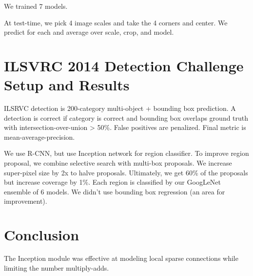 \documentclass[a4paper]{article}
\begin{document}
We trained 7 models.

At test-time, we pick 4 image scales and take the 4 corners and center. We
predict for each and average over scale, crop, and model.

\section{ILSVRC 2014 Detection Challenge Setup and Results}
ILSRVC detection is 200-category multi-object + bounding box prediction.
A detection is correct if category is correct and bounding box overlaps ground
truth with intersection-over-union > 50\%. False positives are penalized. Final
metric is mean-average-precision.

We use R-CNN, but use Inception network for region classifier. To improve
region proposal, we combine selective search with multi-box proposals. We 
increase super-pixel size by 2x to halve proposals. Ultimately, we get 60\%
of the proposals but increase coverage by 1\%. Each region is classified by
our GoogLeNet ensemble of 6 models. We didn't use bounding box regression (an
area for improvement).


\section{Conclusion}
The Inception module was effective at modeling local sparse connections while
limiting the number multiply-adds.
\end{document}

